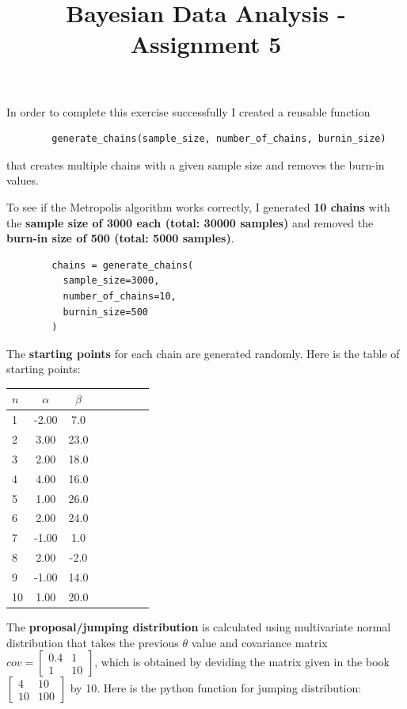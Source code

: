 \documentclass[11pt,a4paper,english]{article}
\title{Bayesian Data Analysis - Assignment 5}
\author{}
\begin{document}
        \maketitle

      In order to complete this exercise successfully I created a reusable function
      \begin{verbatim}
        generate_chains(sample_size, number_of_chains, burnin_size)
      \end{verbatim}
      that creates multiple chains with a given sample size and removes the burn-in values.

      To see if the Metropolis algorithm works correctly, I generated \textbf{10 chains} with
      the \textbf{sample size of 3000 each (total: 30000 samples)} and removed the
      \textbf{burn-in size of 500 (total: 5000 samples)}.
      \begin{verbatim}
        chains = generate_chains(
          sample_size=3000,
          number_of_chains=10,
          burnin_size=500
        )
      \end{verbatim}

      The \textbf{starting points} for each chain are generated randomly. Here is the table of starting points:
      \begin{center}
        \begin{tabular}{l*{6}{c}r}
          $n$ & $\alpha$ & $\beta$ \\
          \hline
          1   &   -2.00   &  7.0  \\
          2   &   3.00    &  23.0 \\
          3   &   2.00    &  18.0 \\
          4   &   4.00    &  16.0 \\
          5   &   1.00    &  26.0 \\
          6   &   2.00    &  24.0 \\
          7   &   -1.00   &  1.0  \\
          8   &   2.00    &  -2.0 \\
          9   &   -1.00   &  14.0 \\
          10  &   1.00    &  20.0 \\
        \end{tabular}
      \end{center}

      The \textbf{proposal/jumping distribution} is calculated using multivariate normal distribution that
      takes the previous $\theta$ value and covariance matrix $cov = \begin{bmatrix}
        0.4 & 1 \\
        1   & 10
      \end{bmatrix}$, which is obtained by deviding the matrix given in the book $\begin{bmatrix}
        4 &  10 \\
        10 & 100
      \end{bmatrix}$ by 10. Here is the python function for jumping distribution:
\end{document}
